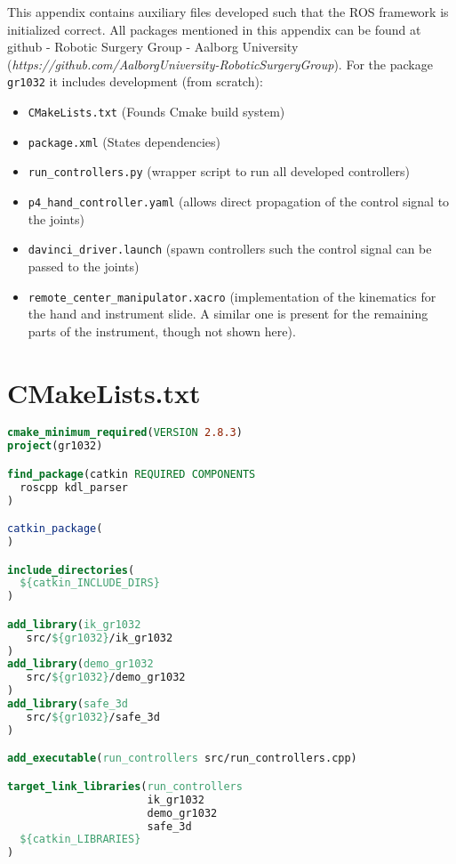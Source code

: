 This appendix contains auxiliary files developed such that the ROS framework is initialized correct. All packages mentioned in this appendix can be found at github - Robotic Surgery Group - Aalborg University (\textit{https://github.com/AalborgUniversity-RoboticSurgeryGroup}). For the package \texttt{gr1032} it includes development (from scratch):
\begin{itemize}
\item \texttt{CMakeLists.txt} (Founds Cmake build system)
\item \texttt{package.xml} (States dependencies)
\item \texttt{run\_controllers.py} (wrapper script to run all developed controllers)
\item \texttt{p4\_hand\_controller.yaml} (allows direct propagation of the control signal to the joints)
\item \texttt{davinci\_driver.launch} (spawn controllers such the control signal can be passed to the joints)
\item \texttt{remote\_center\_manipulator.xacro} (implementation of the kinematics for the hand and instrument slide. A similar one is present for the remaining parts of the instrument, though not shown here).
\end{itemize}
\section*{CMakeLists.txt}
\begin{lstlisting}[language=cmake]
cmake_minimum_required(VERSION 2.8.3)
project(gr1032)

find_package(catkin REQUIRED COMPONENTS
  roscpp kdl_parser
)

catkin_package(
)

include_directories(
  ${catkin_INCLUDE_DIRS}
)

add_library(ik_gr1032
   src/${gr1032}/ik_gr1032
)
add_library(demo_gr1032
   src/${gr1032}/demo_gr1032
)
add_library(safe_3d
   src/${gr1032}/safe_3d
)

add_executable(run_controllers src/run_controllers.cpp)

target_link_libraries(run_controllers
                      ik_gr1032
                      demo_gr1032
                      safe_3d
  ${catkin_LIBRARIES}
)
\end{lstlisting}

